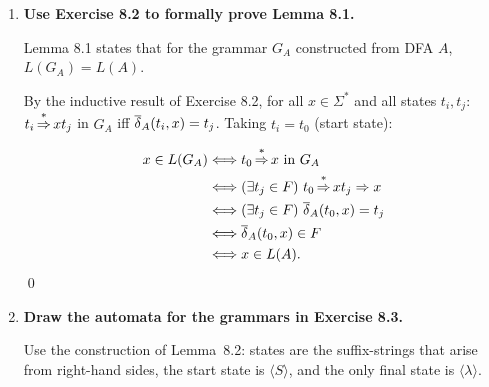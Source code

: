 \begin{enumerate}[{8.}1. ]
\begin{enumerate}
Every derivation cycles: $Z \Rightarrow \pmb{b}T \Rightarrow \pmb{ba}Z \Rightarrow \cdots$, and neither $Z$ nor $T$ has a terminal production, confirming $L(G_6) = \emptyset$.

\item $G_7$: $S \to \pmb{a}S | \pmb{ab}B | \pmb{c}C$, $B \to \pmb{ab}B | \lambda$, $C \to \pmb{c}C | \pmb{ca}$.
\begin{itemize}
\item From $B$: $B = \pmb{ab}B \cup \lambda$, so $L(B) = (\pmb{ab})^*$.
\item From $C$: $C = \pmb{c}C \cup \pmb{ca}$, so $L(C) = \pmb{c}^*\pmb{ca} = \pmb{c}^+\pmb{a}$.
\item From $S$: $S = \pmb{a}S \cup \pmb{ab}B \cup \pmb{c}C = \pmb{a}S \cup \pmb{ab}(\pmb{ab})^* \cup \pmb{c}^+\pmb{a}$.
  Thus
  \[
    S = \pmb{a}S \cup (\pmb{ab})^+ \cup \pmb{c}^+\pmb{a},
  \]
  so
  \[
    L(S) = \pmb{a}^*((\pmb{ab})^+ \cup \pmb{c}^+\pmb{a}).
  \]
\end{itemize}
The regular expression is $\pmb{a}^*(\pmb{ab})^+ \cup \pmb{a}^*\pmb{c}^+\pmb{a}$.
\end{enumerate}

\item \textbf{Use Exercise 8.2 to formally prove Lemma 8.1.}

Lemma 8.1 states that for the grammar $G_A$ constructed from DFA $A$, $L(G_A) = L(A)$.

By the inductive result of Exercise 8.2, for all $x \in \Sigma^*$ and all states $t_i, t_j$: $t_i \operatorname{\overset{*}{\Rightarrow}} x t_j$ in $G_A$ iff $\overline{\delta}_A(t_i, x) = t_j$. Taking $t_i = t_0$ (start state):

\[
\begin{aligned}
x \in L(G_A)
&\Longleftrightarrow t_0 \operatorname{\overset{*}{\Rightarrow}} x \text{ in } G_A\\
&\Longleftrightarrow (\exists t_j\in F)\ t_0 \operatorname{\overset{*}{\Rightarrow}} x t_j \Rightarrow x\\
&\Longleftrightarrow (\exists t_j\in F)\ \overline{\delta}_A(t_0,x)=t_j\\
&\Longleftrightarrow \overline{\delta}_A(t_0,x)\in F\\
&\Longleftrightarrow x\in L(A).
\end{aligned}
\]
\qed

\item \textbf{Draw the automata for the grammars in Exercise 8.3.}

Use the construction of Lemma~8.2: states are the suffix-strings that arise
from right-hand sides, the start state is $\langle S\rangle$, and the only
final state is $\langle\lambda\rangle$.


\end{enumerate}
